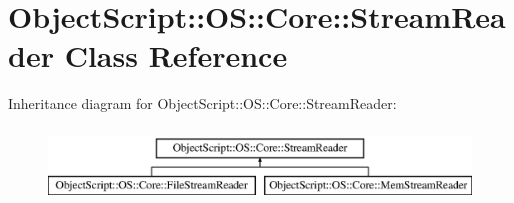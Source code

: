 \hypertarget{class_object_script_1_1_o_s_1_1_core_1_1_stream_reader}{}\section{Object\+Script\+:\+:OS\+:\+:Core\+:\+:Stream\+Reader Class Reference}
\label{class_object_script_1_1_o_s_1_1_core_1_1_stream_reader}
Inheritance diagram for Object\+Script\+:\+:OS\+:\+:Core\+:\+:Stream\+Reader\+:\begin{figure}[H]
\begin{center}
\leavevmode
\includegraphics[height=2.000000cm]{class_object_script_1_1_o_s_1_1_core_1_1_stream_reader}
\end{center}
\end{figure}
